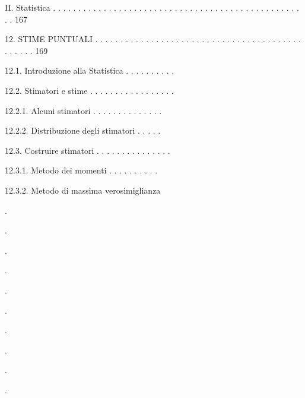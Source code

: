 \documentclass[a4paper,portrait,12pt]{article}
\begin{document}
\begin{flushleft}
II. Statistica . . . . . . . . . . . . . . . . . . . . . . . . . . . . . . . . . . . . . . . . . . . . . . . . . . . 167
\end{flushleft}


\begin{flushleft}
12. STIME PUNTUALI . . . . . . . . . . . . . . . . . . . . . . . . . . . . . . . . . . . . . . . . . . . . . . . 169
\end{flushleft}


\begin{flushleft}
12.1. Introduzione alla Statistica . . . . . . . . . .
\end{flushleft}


\begin{flushleft}
12.2. Stimatori e stime . . . . . . . . . . . . . . . . .
\end{flushleft}


\begin{flushleft}
12.2.1. Alcuni stimatori . . . . . . . . . . . . . .
\end{flushleft}


\begin{flushleft}
12.2.2. Distribuzione degli stimatori . . . . .
\end{flushleft}


\begin{flushleft}
12.3. Costruire stimatori . . . . . . . . . . . . . . .
\end{flushleft}


\begin{flushleft}
12.3.1. Metodo dei momenti . . . . . . . . . .
\end{flushleft}


\begin{flushleft}
12.3.2. Metodo di massima verosimiglianza
\end{flushleft}





.


.


.


.


.


.


.





.


.


.
\end{document}

